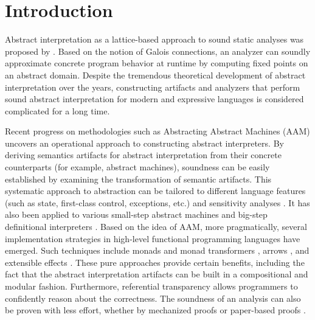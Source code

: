 \section{Introduction} \label{intro}

Abstract interpretation as a lattice-based approach to sound static analyses was
proposed by \citet{DBLP:conf/popl/CousotC77, CousotCousot79-1}. Based on the
notion of Galois connections, an analyzer can soundly approximate concrete
program behavior at runtime by computing fixed points on an abstract domain.
Despite the tremendous theoretical development of abstract interpretation over
the years, constructing artifacts and analyzers that perform sound abstract
interpretation for modern and expressive languages is considered complicated
for a long time.

Recent progress on methodologies such as Abstracting Abstract Machines (AAM)
\cite{DBLP:journals/jfp/HornM12, DBLP:conf/icfp/HornM10} uncovers an operational
approach to constructing abstract interpreters.  By deriving semantics artifacts
for abstract interpretation from their concrete counterparts (for example,
abstract machines), soundness can be easily established by examining the
transformation of semantic artifacts. This systematic approach to abstraction
can be tailored to different language features (such as state, first-class
control, exceptions, etc.) and sensitivity analyses
\cite{DBLP:conf/icfp/Gilray0M16, DBLP:conf/popl/GilrayL0MH16,
Darais:2015:GTM:2814270.2814308}. It has also been applied to various small-step
abstract machines \cite{DBLP:journals/jfp/HornM12, DBLP:conf/icfp/HornM10,
Sergey:2013:MAI:2491956.2491979} and big-step definitional interpreters
\cite{Wei:2018:RAA:3243631.3236800, DBLP:journals/pacmpl/DaraisLNH17,
Keidel:2018:CSP:3243631.3236767}.
Based on the idea of AAM, more pragmatically, several implementation strategies
in high-level functional programming languages have emerged.  Such techniques
include monads and monad transformers \cite{DBLP:journals/pacmpl/DaraisLNH17,
Sergey:2013:MAI:2491956.2491979}, arrows \cite{Keidel:2018:CSP:3243631.3236767},
and extensible effects \cite{Githubsemantic}.
These pure approaches provide certain benefits, including the fact that the
abstract interpretation artifacts can be built in a compositional and modular
fashion. Furthermore, referential transparency allows programmers to confidently
reason about the correctness. The soundness of an
analysis can also be proven with less effort, whether by mechanized proofs
\cite{Darais:2016:CGC:2951913.2951934} or paper-based proofs
\cite{Keidel:2018:CSP:3243631.3236767}.

